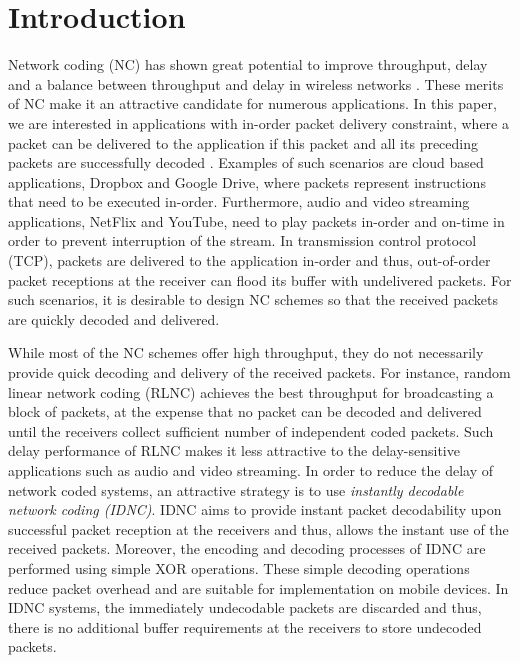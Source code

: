 \documentclass[12pt, peerreview, onecolumn]{IEEEtran}
\begin{document}
\section{Introduction}
Network coding (NC) has shown great potential to improve  throughput,  delay and a balance between
throughput and delay in  wireless  networks \cite{katti2006xors,wanginstantly,sorour2012completion,aboutorabenabling,sadeghi2010optimal,sorour2010decoding,le2013instantly,li2011capacity}. These merits of NC make it an attractive  candidate  for  numerous applications. In  this paper, we are interested in  applications with in-order packet delivery constraint, where  a packet can be delivered to the application if this packet and  all its preceding   packets are successfully decoded \cite{sundararajan2009feedback}. Examples of such  scenarios are  cloud based applications, Dropbox and Google Drive, where  packets represent instructions that need to be executed in-order.   Furthermore, audio and video streaming  applications,   NetFlix and YouTube, need to    play packets in-order and on-time  in order to prevent interruption  of the stream. In transmission control protocol (TCP),   packets are delivered to the application  in-order and thus, out-of-order packet receptions at the receiver can flood its buffer with undelivered packets.   For such scenarios, it is desirable to design NC schemes so that the received packets are quickly decoded and delivered.


While most of the  NC schemes offer high throughput, they do not necessarily  provide quick decoding and delivery of the received packets. For instance, random linear network coding (RLNC) \cite{Ho2006random} achieves the best throughput  for broadcasting a block of packets, at the expense that  no packet can be decoded and delivered until the receivers collect sufficient number of independent coded packets.  Such delay performance of  RLNC  makes it less attractive to the delay-sensitive applications such as audio and video streaming. In order to reduce the delay of network coded systems, an attractive strategy is to use  \emph{instantly decodable network coding (IDNC)}\cite{katti2006xors,wanginstantly,sorour2012completion,aboutorabenabling,sadeghi2010optimal,sorour2010decoding,le2013instantly,li2011capacity}. IDNC aims to provide instant packet decodability upon successful packet reception at the receivers  and thus,  allows the instant use of the received packets. Moreover, the encoding and decoding processes of IDNC are performed using simple XOR operations.  These simple decoding operations  reduce packet overhead and
are suitable for implementation on mobile devices. In IDNC systems, the immediately undecodable  packets  are  discarded and thus, there is no additional buffer requirements at the receivers to store undecoded  packets.
\end{document}
